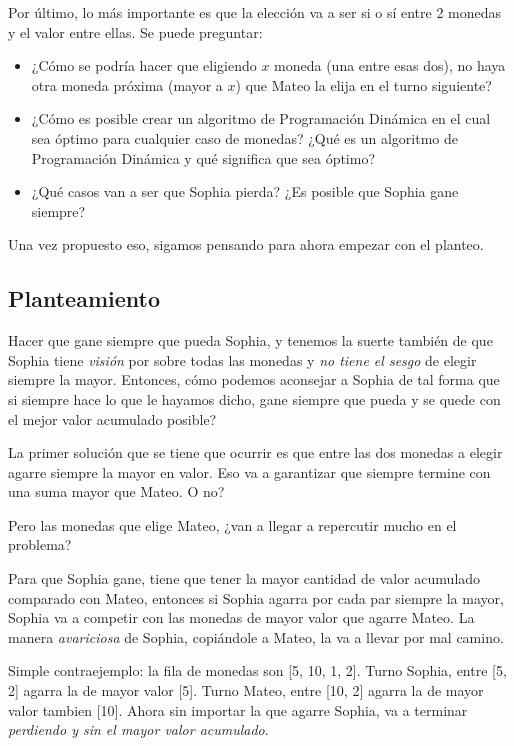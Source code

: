 \vspace{0.425cm}
Por último, lo más importante es que la elección va a ser si o sí entre 2 monedas y el valor entre ellas. Se puede preguntar:
\begin{itemize}
    \item ¿Cómo se podría hacer que eligiendo $x$ moneda (una entre esas dos), no haya otra moneda próxima (mayor a $x$) que Mateo la elija en el turno siguiente? 
    \item ¿Cómo es posible crear un algoritmo de Programación Dinámica en el cual sea óptimo para cualquier caso de monedas? ¿Qué es un algoritmo de Programación Dinámica y qué significa que sea óptimo?
    \item ¿Qué casos van a ser que Sophia pierda? ¿Es posible que Sophia gane siempre?
\end{itemize}
Una vez propuesto eso, sigamos pensando para ahora empezar con el planteo.

\subsection{Planteamiento}

Hacer que gane siempre que pueda Sophia, y tenemos la suerte también de que Sophia tiene \textit{visión} por sobre todas las monedas y \textit{no tiene el sesgo} de elegir siempre la mayor. Entonces, cómo podemos aconsejar a Sophia de tal forma que si siempre hace lo que le hayamos dicho, gane siempre que pueda y se quede con el mejor valor acumulado posible?

La primer solución que se tiene que ocurrir es que entre las dos monedas a elegir agarre siempre la mayor en valor. Eso va a garantizar que siempre termine con una suma mayor que Mateo. O no?

Pero las monedas que elige Mateo, ¿van a llegar a repercutir mucho en el problema?

Para que Sophia gane, tiene que tener la mayor cantidad de valor acumulado comparado con Mateo, entonces si Sophia agarra por cada par siempre la mayor, Sophia va a competir con las monedas de mayor valor que agarre Mateo. La manera \textit{avariciosa} de Sophia, copiándole a Mateo, la va a llevar por mal camino.

Simple contraejemplo: la fila de monedas son [5, 10, 1, 2]. Turno Sophia, entre [5, 2] agarra la de mayor valor [5]. Turno Mateo, entre [10, 2] agarra la de mayor valor tambien [10]. Ahora sin importar la que agarre Sophia, va a terminar \textit{perdiendo y sin el mayor valor acumulado}.

